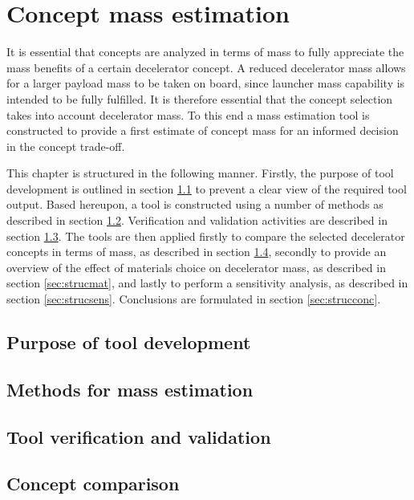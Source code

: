 \section{Concept mass estimation} \label{ch:strucmass}
It is essential that concepts are analyzed in terms of mass to fully appreciate the mass benefits of a certain decelerator concept. A reduced decelerator mass allows for a larger payload mass to be taken on board, since launcher mass capability is intended to be fully fulfilled. It is therefore essential that the concept selection takes into account decelerator mass. To this end a mass estimation tool is constructed to provide a first estimate of concept mass for an informed decision in the concept trade-off.

This chapter is structured in the following manner. Firstly, the purpose of tool development is outlined in section \ref{sec:strucpurp} to prevent a clear view of the required tool output. Based hereupon, a tool is constructed using a number of methods as described in section \ref{sec:strucmeth}. Verification and validation activities are described in section \ref{sec:strucvv}. The tools are then applied firstly to compare the selected decelerator concepts in terms of mass, as described in section \ref{sec:struccc}, secondly to provide an overview of the effect of materials choice on decelerator mass, as described in section \ref{sec:strucmat}, and lastly to perform a sensitivity analysis, as described in section \ref{sec:strucsens}. Conclusions are formulated in section \ref{sec:strucconc}.

\subsection{Purpose of tool development}\label{sec:strucpurp}



\subsection{Methods for mass estimation}\label{sec:strucmeth}

\subsection{Tool verification and validation}\label{sec:strucvv}

\subsection{Concept comparison}\label{sec:struccc}

